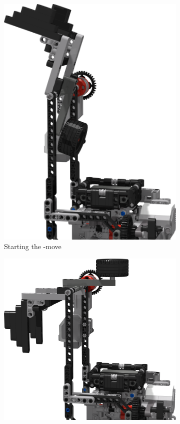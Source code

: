 \documentclass{report}
\newcommand{\move}[1]{\uppercase{\texttt{\formatmovesnospace{#1}}}-move}
\begin{document}
\begin{figure}[H]
\begin{subfigure}[b]{0.21688\textwidth}
			\includegraphics[width=\textwidth]{Resources/Images/rdrXMoveArmV1_2.png}
			\caption{Starting the \move{X}}
			\label{fig:rdrXMoveArmV1_2}
		\end{subfigure}
		\hspace{10mm}
		\begin{subfigure}[b]{0.31623\textwidth}
			\includegraphics[width=\textwidth]{Resources/Images/rdrXMoveArmV1_3.png}

\end{subfigure}
\end{figure}
\end{document}
